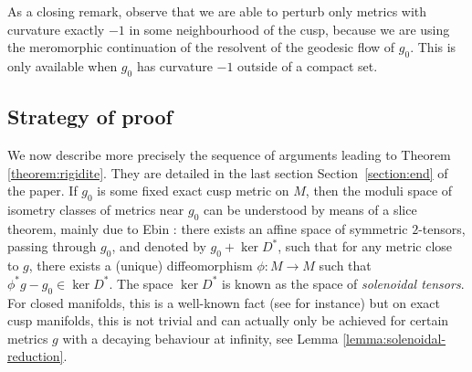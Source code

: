 \documentclass[10pt]{amsart}
\theoremstyle{plain}
\theoremstyle{definition}
\begin{document}
As a closing remark, observe that we are able to perturb only metrics with curvature exactly $-1$ in some neighbourhood of the cusp, because we are using the meromorphic continuation of the resolvent of the geodesic flow of $g_0$. This is only available when $g_0$ has curvature $-1$ outside of a compact set.\enlargethispage{.5\baselineskip}

\subsection{Strategy of proof}
We now describe more precisely the sequence of arguments leading to Theorem \ref{theorem:rigidite}. They are detailed in the last section Section~\ref{section:end} of the paper. If $g_0$ is some fixed exact cusp metric on $M$, then the moduli space of isometry classes of metrics near $g_0$ can be understood by means of a slice theorem, mainly due to Ebin \cite{Ebin-68}: there exists an affine space of symmetric $2$-tensors, passing through $g_0$, and denoted by $g_0 + \ker D^*$, such that for any metric close to $g$, there exists a (unique) diffeomorphism $\phi : M \to M$ such that $\phi^*g-g_0 \in \ker D^*$. The space $\ker D^*$ is known as the space of \emph{solenoidal tensors}. For closed manifolds, this is a well-known fact (see \cite[Lem.\,4.1]{Guillarmou-Lefeuvre-18} for instance) but on exact cusp manifolds, this is not trivial and can actually only be achieved for certain metrics $g$ with a decaying behaviour at infinity, see Lemma \ref{lemma:solenoidal-reduction}.
\end{document}
